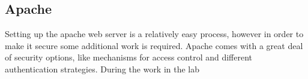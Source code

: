\subsection {Apache}

Setting up the apache web server is a relatively easy process, however in order to make it secure some additional work is required. Apache comes with a great deal of security options, like mechanisms for access control and different authentication strategies. During the work in the lab 